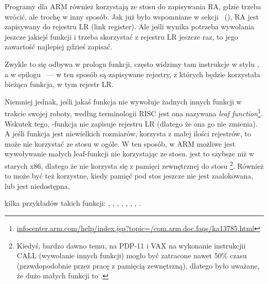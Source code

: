 Programy dla ARM również korzystają ze stosu do zapisywania \ac{RA}, gdzie trzeba wrócić, ale trochę w inny sposób.
Jak już było wspomniane w sekcji \q{\HelloWorldSectionName}~(),
\ac{RA} jest zapisywany do rejestru \ac{LR} (\gls{link register}).
Ale jeśli wynika potrzeba wywołania jeszcze jakiejś funkcji i trzeba skorzystać z rejestru \ac{LR} jeszcze
raz, to jego zawartość najlepiej gdzieś zapisać.

Zwykle to się odbywa w prologu funkcji, często widzimy tam instrukcje w stylu , a w epilogu
~--- w ten sposób są zapisywane rejestry, z których będzie korzystała bieżąca funkcja, w tym rejestr \ac{LR}.

Niemniej jednak, jeśli jakaś funkcja nie wywołuje żadnych innych funkcji w trakcie swojej roboty, według terminologii \ac{RISC} jest ona nazywana
\emph{\gls{leaf function}}\footnote{\href{http://go.yurichev.com/17064}{infocenter.arm.com/help/index.jsp?topic=/com.arm.doc.faqs/ka13785.html}}. 
Wskutek tego, -funkcja nie zapisuje rejestru \ac{LR} (dlatego że ona go nie zmienia).
A jeśli funkcja jest niewielkich rozmiarów, korzysta z małej ilości rejestrów, to może nie korzystać ze stosu w ogóle.
W ten sposób, w ARM możliwe jest wywoływanie małych leaf-funkcji nie korzystając ze stosu.
jest to szybsze niż w starych x86, dlatego że nie korzysta się z pamięci zewnętrznej do stosu
\footnote{Kiedyś, bardzo dawno temu, na PDP-11 i VAX na wykonanie instrukcjii CALL (wywołanie innych funkcji) mogło być zatracone
nawet 50\% czasu (przwdopodobnie przez pracę z pamięcią zewnętrzną),
dlatego było uważane, że dużo małych funkcji to 
.}.
Również to może być też korzystne, kiedy pamięć pod stos jeszcze nie jest zaalokowana, lub jest niedostępna,

kilka przykładów takich funkcji:
, , 
, , ,
, , .


